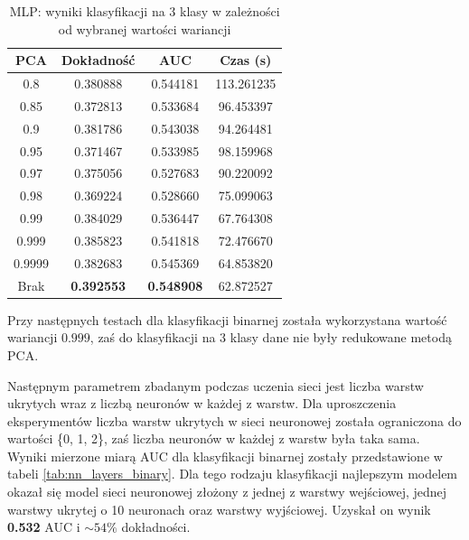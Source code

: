 \documentclass[a4paper, twoside, 11pt, openright]{article}
\begin{document}
\begin{table}[H]
    \centering
    \begin{tabular}{|c|c|c|c|}
    \hline
        \textbf{PCA} & \textbf{Dokładność} &  \textbf{AUC} &  \textbf{Czas (s)} \\ \hline
0.8                &  0.380888 &  0.544181 &  113.261235 \\ \hline
0.85               &  0.372813 &  0.533684 &   96.453397 \\ \hline
0.9                &  0.381786 &  0.543038 &   94.264481 \\ \hline
0.95               &  0.371467 &  0.533985 &   98.159968 \\ \hline
0.97               &  0.375056 &  0.527683 &   90.220092 \\ \hline
0.98               &  0.369224 &  0.528660 &   75.099063 \\ \hline
0.99               &  0.384029 &  0.536447 &   67.764308 \\ \hline
0.999              &  0.385823 &  0.541818 &   72.476670 \\ \hline
0.9999             &  0.382683 &  0.545369 &   64.853820 \\ \hline
Brak                &  \textbf{0.392553} &  \textbf{0.548908} &   62.872527 \\ \hline
    \end{tabular}
    \caption{MLP: wyniki klasyfikacji na 3 klasy w zależności od wybranej wartości wariancji}
    \label{tab:nn_pca_discrete}
\end{table}

Przy następnych testach dla klasyfikacji binarnej została wykorzystana wartość wariancji $0.999$, zaś do klasyfikacji na 3 klasy dane nie były redukowane metodą PCA.

\bigskip

Następnym parametrem zbadanym podczas uczenia sieci jest liczba warstw ukrytych wraz z liczbą neuronów w każdej z warstw. Dla uproszczenia eksperymentów liczba warstw ukrytych w sieci neuronowej została ograniczona do wartości \{0, 1, 2\}, zaś liczba neuronów w każdej z warstw była taka sama. Wyniki mierzone miarą AUC dla klasyfikacji binarnej zostały przedstawione w tabeli \ref{tab:nn_layers_binary}. Dla tego rodzaju klasyfikacji najlepszym modelem okazał się model sieci neuronowej złożony z jednej z warstwy wejściowej, jednej warstwy ukrytej o 10 neuronach oraz warstwy wyjściowej. Uzyskał on wynik \textbf{0.532} AUC i $\sim 54\%$ dokładności.
\end{document}

